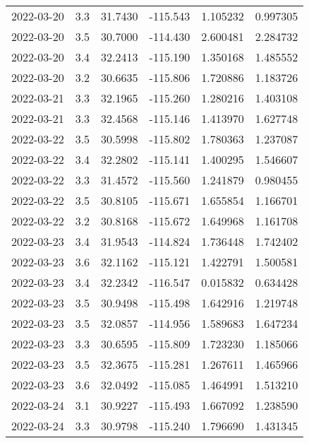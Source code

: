 \begin{tabular}{lrrrrr}
2022-03-20 &       3.3 &  31.7430 &  -115.543 &         1.105232 &         0.997305 \\
2022-03-20 &       3.5 &  30.7000 &  -114.430 &         2.600481 &         2.284732 \\
2022-03-20 &       3.4 &  32.2413 &  -115.190 &         1.350168 &         1.485552 \\
2022-03-20 &       3.2 &  30.6635 &  -115.806 &         1.720886 &         1.183726 \\
2022-03-21 &       3.3 &  32.1965 &  -115.260 &         1.280216 &         1.403108 \\
2022-03-21 &       3.3 &  32.4568 &  -115.146 &         1.413970 &         1.627748 \\
2022-03-22 &       3.5 &  30.5998 &  -115.802 &         1.780363 &         1.237087 \\
2022-03-22 &       3.4 &  32.2802 &  -115.141 &         1.400295 &         1.546607 \\
2022-03-22 &       3.3 &  31.4572 &  -115.560 &         1.241879 &         0.980455 \\
2022-03-22 &       3.5 &  30.8105 &  -115.671 &         1.655854 &         1.166701 \\
2022-03-22 &       3.2 &  30.8168 &  -115.672 &         1.649968 &         1.161708 \\
2022-03-23 &       3.4 &  31.9543 &  -114.824 &         1.736448 &         1.742402 \\
2022-03-23 &       3.6 &  32.1162 &  -115.121 &         1.422791 &         1.500581 \\
2022-03-23 &       3.4 &  32.2342 &  -116.547 &         0.015832 &         0.634428 \\
2022-03-23 &       3.5 &  30.9498 &  -115.498 &         1.642916 &         1.219748 \\
2022-03-23 &       3.5 &  32.0857 &  -114.956 &         1.589683 &         1.647234 \\
2022-03-23 &       3.3 &  30.6595 &  -115.809 &         1.723230 &         1.185066 \\
2022-03-23 &       3.5 &  32.3675 &  -115.281 &         1.267611 &         1.465966 \\
2022-03-23 &       3.6 &  32.0492 &  -115.085 &         1.464991 &         1.513210 \\
2022-03-24 &       3.1 &  30.9227 &  -115.493 &         1.667092 &         1.238590 \\
2022-03-24 &       3.3 &  30.9798 &  -115.240 &         1.796690 &         1.431345 \\

\end{tabular}
